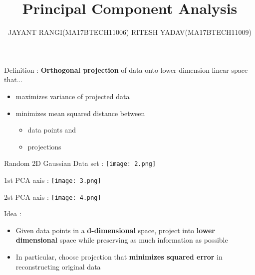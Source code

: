 \documentclass{beamer}
\title{Principal Component Analysis}
\author{JAYANT RANGI(MA17BTECH11006) \newline RITESH YADAV(MA17BTECH11009) }
\begin{document}
\maketitle

\begin{frame}{Definition :}
\textbf{Orthogonal projection} of data onto lower-dimension linear space that...
\begin{itemize}
\newline
\item maximizes variance of projected data
\newline
\item minimizes mean squared distance between
\newline
\hspace{1cm}\begin{itemize}
    \item data points and
    \newline
    \item projections
\end{itemize}
\end{itemize}
\end{frame}
\begin{frame}{Random 2D Gaussian Data set :}
\centering
    \texttt{[image: 2.png]}
\end{frame}{}
\begin{frame}{1st PCA axis :}
\centering
    \texttt{[image: 3.png]}
\end{frame}{}
\begin{frame}{2st PCA axis :}
\centering
    \texttt{[image: 4.png]}
\end{frame}{}
\begin{frame}{Idea :}
\begin{itemize}
\item Given data points in a \textbf{d-dimensional} space,
project into \textbf{lower dimensional} space while
preserving as much information as possible
\newline
\newline
\item In particular, choose projection that
\textbf{minimizes squared error} in reconstructing original data
\end{itemize}    
\end{frame}
\end{document}
